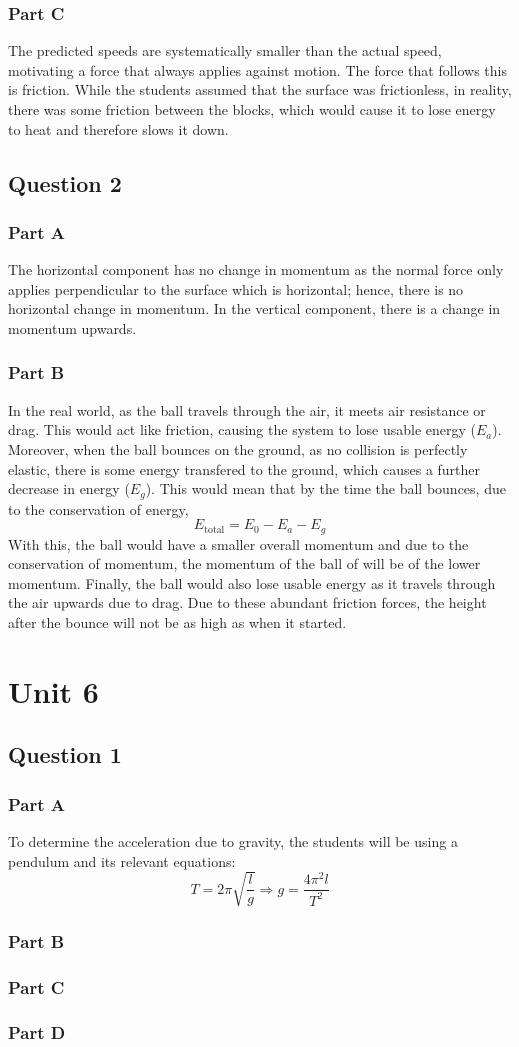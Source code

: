 \documentclass[]{scrartcl}
\begin{document}
\subsubsection*{Part C}
The predicted speeds are systematically smaller than the actual speed, motivating a force that always applies against motion. The force that follows this is friction. While the students assumed that the surface was frictionless, in reality, there was some friction between the blocks, which would cause it to lose energy to heat and therefore slows it down.
\subsection*{Question 2}
\subsubsection*{Part A}
The horizontal component has no change in momentum as the normal force only applies perpendicular to the surface which is horizontal; hence, there is no horizontal change in momentum. In the vertical component, there is a change in momentum upwards.
\subsubsection*{Part B}
In the real world, as the ball travels through the air, it meets air resistance or drag. This would act like friction, causing the system to lose usable energy ($E_a$). Moreover, when the ball bounces on the ground, as no collision is perfectly elastic, there is some energy transfered to the ground, which causes a further decrease in energy ($E_g$). This would mean that by the time the ball bounces, due to the conservation of energy,
$$E_{\text{total}} = E_0 - E_a - E_g$$
With this, the ball would have a smaller overall momentum and due to the conservation of momentum, the momentum of the ball of will be of the lower momentum. Finally, the ball would also lose usable energy as it travels through the air upwards due to drag. Due to these abundant friction forces, the height after the bounce will not be as high as when it started.
\section*{Unit 6}
\subsection*{Question 1}
\subsubsection*{Part A}
To determine the acceleration due to gravity, the students will be using a pendulum and its relevant equations:
$$T = 2\pi\sqrt{\dfrac{l}{g}}\Longrightarrow  \boxed{g = \dfrac{4\pi^2 l}{T^2}}$$
\subsubsection*{Part B}
\begin{enumerate}

\end{enumerate}
\subsubsection*{Part C}

\subsubsection*{Part D}
\end{document}
